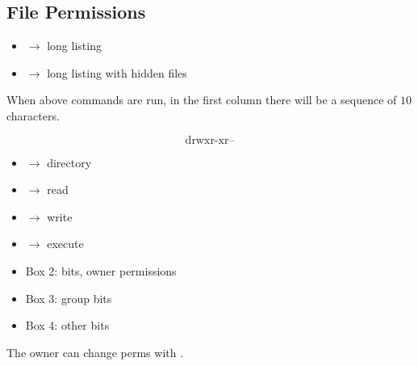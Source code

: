 \subsection{File Permissions}

\begin{itemize}
    \item {} $ \rightarrow $ long listing
    \item {} $ \rightarrow $ long listing with hidden files
\end{itemize}
When above commands are run, in the first column there will be a sequence
of $ 10 $ characters.

\begin{center}
    \[
        \boxed{\text{d}}\boxed{\text{rwx}}\boxed{\text{r-x}}\boxed{\text{r--}}
    \]
\end{center}
\begin{itemize}
    \item {} $ \rightarrow $ directory
    \item {} $ \rightarrow $ read
    \item {} $ \rightarrow $ write
    \item {} $ \rightarrow $ execute
    \item Box 2:  bits, owner permissions
    \item Box 3: group bits
    \item Box 4: other bits
\end{itemize}
The owner can change perms with .


